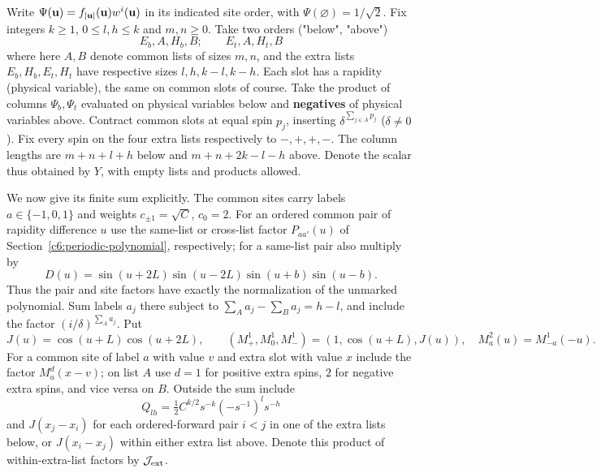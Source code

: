 Write \(\Psi({\bf u})= f_{|{\bf u}|}({\bf u})w^i({\bf u})\) in its indicated site order, with \(\Psi(\varnothing)=1/\sqrt2\). Fix integers \(k\ge1\), \(0\le l,h\le k\) and \(m,n\ge0\). Take two orders ("below", "above")
\[
 E_b, A, H_b, B;\qquad E_t, A, H_t, B
\]
where here \(A,B\) denote common lists of sizes \(m,n\), and the extra lists \(E_b,H_b,E_t,H_t\) have respective sizes \(l,h,k-l,k-h\). Each slot has a rapidity (physical variable), the same on common slots of course. Take the product of columns \(\Psi_b,\Psi_t\) evaluated on physical variables below and \textbf{negatives} of physical variables above. Contract common slots at equal spin \(p_j\), inserting \(\delta^{\sum_{j\in A} p_j}\) (\(\delta\ne0\)). Fix every spin on the four extra lists respectively to \(-,+,+,-\). The column lengths are \(m+n+l+h\) below and \(m+n+2k-l-h\) above. Denote the scalar thus obtained by \(Y\), with empty lists and products allowed.

We now give its finite sum explicitly.  The common sites carry labels
$a\in\{-1,0,1\}$ and weights $c_{\pm1}=\sqrt C$, $c_0=2$.  For an
ordered common pair of rapidity difference $u$ use the same-list or
cross-list factor $P_{aa'}(u)$ of
Section~\ref{c6:periodic-polynomial}, respectively; for a same-list pair
also multiply by
\[
 D(u)=\sin(u+2L)\sin(u-2L)\sin(u+b)\sin(u-b).
\]
Thus the pair and site factors have exactly the normalization of the
unmarked polynomial. Sum labels \(a_j\) there subject to \(\sum_A a_j-\sum_B a_j=h-l\), and include the factor \((i/\delta)^{\sum_A a_j}\). Put
\[
 J(u)=\cos(u+L)\cos(u+2L),\qquad
 (M^1_+,M^1_0,M^1_-)=(1,\cos(u+L),J(u)),\quad M^2_a(u)=M^1_{-a}(-u).
\]
For a common site of label \(a\) with value \(v\) and extra slot with value \(x\) include the factor \(M_a^{d}(x-v)\); on list \(A\) use \(d=1\) for positive extra spins, \(2\) for negative extra spins, and vice versa on \(B\). Outside the sum include
\[
 Q_{lh}=\tfrac12 C^{k/2}s^{-k}(-s^{-1})^l s^{-h}
\]
and \(J(x_j-x_i)\) for each ordered-forward pair \(i<j\) in one of the extra lists below, or \(J(x_i-x_j)\) within either extra list above. Denote this product of within-extra-list factors by \(\mathcal J_{\rm ext}\).


